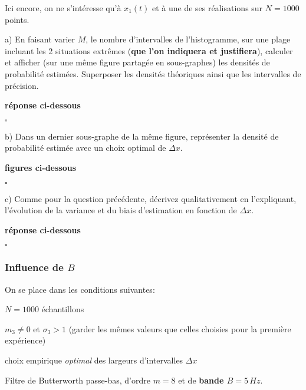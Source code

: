 \documentclass{article}
\newcommand{\debutrep}[1]{\color{blue}\begin{center} \hrulefill \textbf{ #1 } \hrulefill \end{center} }
\newcommand{\finrep}{\vspace*{5mm}\hfill $\square$\color{black}\vspace*{5mm}}
\begin{document}
Ici encore, on ne s'intéresse qu'à $x_1(t)$ et à une de ses réalisations sur $N=1000$ points.

\begin{list}{}{\setlength{\leftmargin}{6mm} \setlength{\labelwidth}{20mm} \setlength{\labelsep}{2mm} \setlength{\itemsep}{1mm} }

\item[a)]  En faisant varier $M$, le nombre d'intervalles de l'histogramme, sur une plage incluant les 2 situations extrêmes (\textbf{que l'on indiquera et justifiera}), calculer et afficher (sur une même figure partagée en sous-graphes) les densités de probabilité estimées. Superposer les densités théoriques ainsi que les intervalles de précision.


\debutrep{réponse ci-dessous}

\finrep

\item[b)] Dans un dernier sous-graphe de la même figure, représenter la densité de probabilité estimée avec un choix optimal de $\Delta x$.

\debutrep{figures ci-dessous}

\finrep


\item[c)] Comme pour la question précédente, décrivez qualitativement  en l'expliquant, l'évolution de la variance et du biais d'estimation en fonction de $\Delta x$. 

\debutrep{réponse ci-dessous}

\finrep

\end{list}

\subsubsection{Influence de $B$}

On se place dans les conditions suivantes:

\begin{list}{-}{\setlength{\leftmargin}{3mm} \setlength{\labelwidth}{20mm} \setlength{\labelsep}{2mm} \setlength{\itemsep}{1mm} }
\item $N=1000$ échantillons
\item $m_3 \neq 0$ et $\sigma_3>1$ (garder les mêmes valeurs que celles choisies pour la première expérience)
\item choix empirique {\em optimal} des largeurs d'intervalles $\Delta x$
\item Filtre de Butterworth passe-bas, d'ordre $m=8$ et de \textbf{bande $B=5\,Hz$}.
\end{list}
\end{document}
